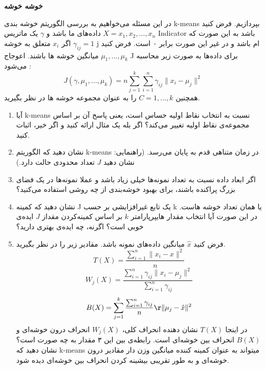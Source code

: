 \textbf{خوشه خوشه}

در این مسئله می‌خواهیم به بررسی الگوریتم خوشه بندی
k-means بپردازیم. فرض کنید \(X = {x_1, x_2, ..., x_n}\) داده‌های ما باشد و $\gamma$ یک ماتریس Indicator باشد به این صورت که $\gamma_{ij} = 1$ اگر \(x_i\) متعلق به خوشه j ام باشد و در غیر این صورت برابر ۰ است. فرض کنید $\mu_1, ..., \mu_k$ میانگین خوشه ها باشند. اعوجاج J برای داده‌ها به صورت زیر محاسبه می‌شود :
\[J(\gamma, \mu_1, ..., \mu_k) = n\sum_{j=1}^{k}\sum_{i=1}^{n}\gamma_{ij}\lVert x_i - \mu_j \rVert^2\]
همچنین \(C = 1, ..., k\) را به عنوان مجموعه خوشه ها در نظر بگیرید.
\begin{enumerate}
\item
آیا k-means نسبت به انتخاب نقاط اولیه حساس است، یعنی پاسخ آن بر اساس مجموعه‌ی نقاط اولیه تغییر می‌کند؟ اگر بله یک مثال ارائه کنید و اگر خیر، اثبات کنید.
\vspace{4cm}
\item
نشان دهید که الگوریتم k-means در زمان متناهی قدم به پایان می‌رسد. (راهنمایی: نشان دهید $J$ تعداد محدودی حالت دارد.)
\vspace{7cm}
\item
اگر ابعاد داده نسبت به تعداد نمونه‌ها خیلی زیاد باشد و عملا نمونه‌ها در یک فضای بزرگ پراکنده باشند، برای بهبود خوشه‌بندی از چه روشی استفاده می‌کنید؟
\pagebreak
\item
نشان دهید که کمینه J یک تابع غیرافزایشی بر حسب k یا همان تعداد خوشه هاست. در این صورت آیا انتخاب مقدار هایپرپارامتر $k$ بر اساس کمینه‌کردن مقداز $J$ ایده‌ی خوبی است؟ اگرنه، چه ایده‌ی بهتری دارید؟
\vspace{7cm}
\item
فرض کنید $\hat{x}$ میانگین داده‌های نمونه باشد. مقادیر زیر را در نظر بگیرید.
\[T(X) = \frac{\sum_{i=1}^{n}\lVert x_i - \hat{x}\rVert^2}{n}\]
\[W_j(X) = \frac{\sum_{i=1}^{n}\gamma_{ij}\lVert x_i - \mu_j\rVert^2}{\sum_{i=1}^{n}\gamma_{ij}}\]
\[B(X) = \sum_{j=1}^{k}\frac{\sum_{i=1}^{n}\gamma_{ij}}{n}\r\lVert \mu_j - \hat{x} \rVert^2\]
در اینجا \(T(X)\) نشان دهنده انحراف کلی، \(W_j(X)\) انحراف 
درون خوشه‌ای و \(B(X)\) انحراف بین خوشه‌ای است.
رابطه‌ی بین این ۳ مقدار به چه صورت است؟
نشان دهید که k-means میتواند به عنوان کمینه کننده میانگین وزن دار مقادیر درون خوشه‌ای و به طور تقریبی بیشینه کردن انحراف بین خوشه‌ای دیده شود.
\vspace{7cm}
\end{enumerate}